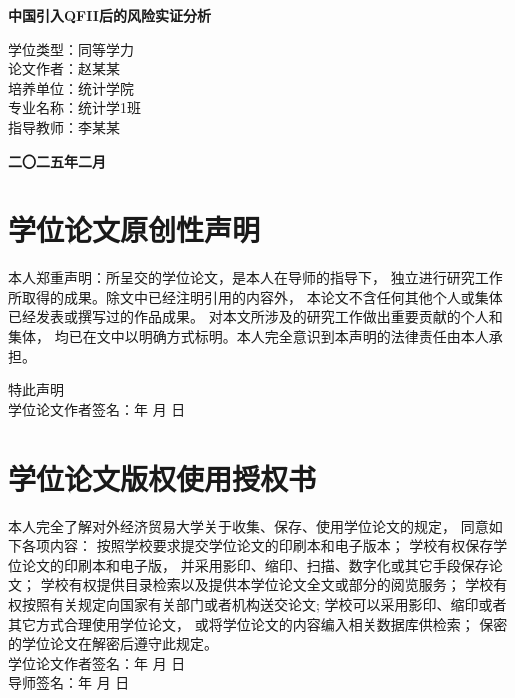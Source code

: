 \documentclass[UTF8,a4paper]{ctexart}
\begin{document}
\thispagestyle{empty}
\begin{center}
    \vspace*{2cm}
    {\heiti\bfseries{} 中国引入QFII后的风险实证分析}
    
    \vspace{3cm}
    {\songti\bfseries{}
    \begin{flushleft}
    \hspace{8em}学位类型：同等学力 \\
    \hspace{8em}论文作者：赵某某 \\
    \hspace{8em}培养单位：统计学院 \\
    \hspace{8em}专业名称：统计学1班 \\
    \hspace{8em}指导教师：李某某\\
    \end{flushleft}
    }
    
    \vfill
    {\heiti\bfseries{} 二〇二五年二月}
\end{center}

\newpage
\thispagestyle{empty}
\section*{学位论文原创性声明}
\begin{spacing}{1.5}
{\songti{}
本人郑重声明：所呈交的学位论文，是本人在导师的指导下，
独立进行研究工作所取得的成果。除文中已经注明引用的内容外，
本论文不含任何其他个人或集体已经发表或撰写过的作品成果。
对本文所涉及的研究工作做出重要贡献的个人和集体，
均已在文中以明确方式标明。本人完全意识到本声明的法律责任由本人承担。

特此声明\\[2cm]

学位论文作者签名：\quad \quad \quad \quad 年 \quad 月 \quad 日}
\end{spacing}

\newpage
\thispagestyle{empty}
\section*{学位论文版权使用授权书}
\begin{spacing}{1.5}
{\songti{}
本人完全了解对外经济贸易大学关于收集、保存、使用学位论文的规定，
同意如下各项内容：
按照学校要求提交学位论文的印刷本和电子版本；
学校有权保存学位论文的印刷本和电子版，
并采用影印、缩印、扫描、数字化或其它手段保存论文；
学校有权提供目录检索以及提供本学位论文全文或部分的阅览服务；
学校有权按照有关规定向国家有关部门或者机构送交论文; 
学校可以采用影印、缩印或者其它方式合理使用学位论文，
或将学位论文的内容编入相关数据库供检索；
保密的学位论文在解密后遵守此规定。\\[2cm]

学位论文作者签名：\quad \quad \quad 年 \quad 月 \quad 日\\

导师签名：\quad \quad \quad \quad \quad \quad \quad 年 \quad 月 \quad 日}
\end{spacing}
\end{document}
